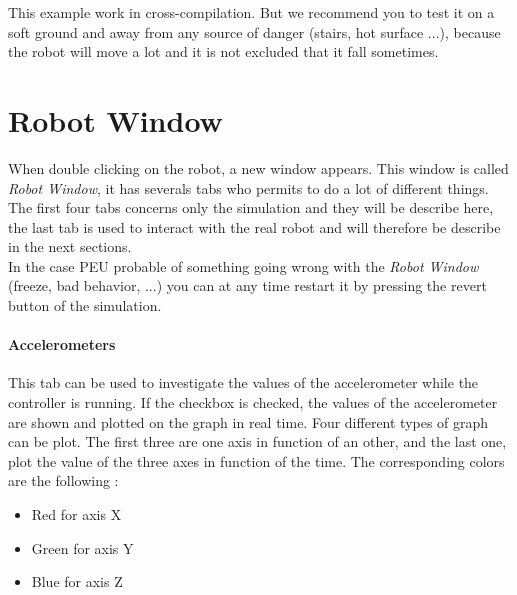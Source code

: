 \documentclass[a4paper, 12pt]{article}  		%
\begin{document}
This example work in cross-compilation. But we recommend you to test it on a soft ground and away from any source of danger (stairs, hot surface ...), because the robot will move a lot and it is not excluded that it fall sometimes.\\



\newpage
\section{Robot Window}

When double clicking on the robot, a new window appears. This window is called \textit{Robot Window}, it has severals tabs who permits to do a lot of different things. The first four tabs concerns only the simulation and they will be describe here, the last tab is used to interact with the real robot and will therefore be describe in the next sections.\\

In the case PEU probable of something going wrong with the \textit{Robot Window} (freeze, bad behavior, ...) you can at any time restart it by pressing the revert button of the simulation.\\

\paragraph*{Accelerometers} 
This tab can be used to investigate the values of the accelerometer while the controller is running. If the checkbox is checked, the values of the accelerometer are shown and plotted on the graph in real time. Four different types of graph can be plot. The first three are one axis in function of an other, and the last one, plot the value of the three axes in function of the time. The corresponding colors are the following :\\
\begin{itemize}
\item Red for axis X
\item Green for axis Y
\item Blue for axis Z
\end{itemize}
\end{document}
